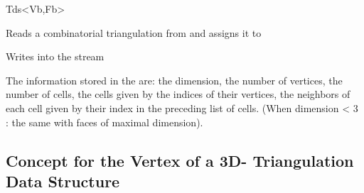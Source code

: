 \begin{ccClassTemplate}{Tds<Vb,Fb>}

{Reads a combinatorial triangulation from  and assigns it to }

{Writes  into the stream }

The information stored in the  are: 
the dimension, the number of vertices, the number of cells,
the cells given by the indices of their vertices, the neighbors of
each cell given by their index in the preceding list of cells.
(When dimension < 3 : the same with faces of maximal dimension).

	\end{ccClassTemplate} 

	\subsection{Concept for the Vertex of a 3D- Triangulation Data Structure} 
	\label{TDS3-sec-concept-Tds_Vertex}

